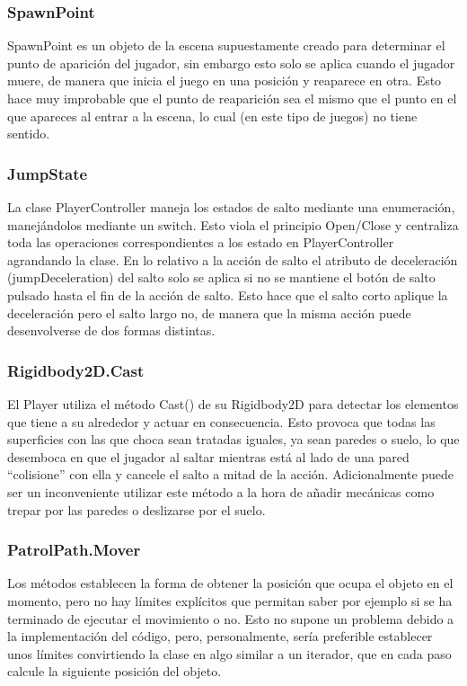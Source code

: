 \subsubsection{SpawnPoint}
SpawnPoint es un objeto de la escena supuestamente creado para determinar el punto de aparición del jugador, sin embargo esto solo se aplica cuando el jugador muere, de manera que inicia el juego en una posición y reaparece en otra. Esto hace muy improbable que el punto de reaparición sea el mismo que el punto en el que apareces al entrar a la escena, lo cual (en este tipo de juegos) no tiene sentido.

\subsubsection{JumpState}
La clase PlayerController maneja los estados de salto mediante una enumeración, manejándolos mediante un switch. Esto viola el principio Open/Close y centraliza toda las operaciones correspondientes a los estado en PlayerController agrandando la clase. 
En lo relativo a la acción de salto el atributo de deceleración (jumpDeceleration) del salto solo se aplica si no se mantiene el botón de salto pulsado hasta el fin de la acción de salto. Esto hace que el salto corto aplique la deceleración pero el salto largo no, de manera que la misma acción puede desenvolverse de dos formas distintas. 

\subsubsection{Rigidbody2D.Cast}
El Player utiliza el método Cast() de su Rigidbody2D para detectar los elementos que tiene a su alrededor y actuar en consecuencia. Esto provoca que todas las superficies con las que choca sean tratadas iguales, ya sean paredes o suelo, lo que desemboca en que el jugador al saltar mientras está al lado de una pared “colisione” con ella y cancele el salto a mitad de la acción. Adicionalmente puede ser un inconveniente utilizar este método a la hora de añadir mecánicas como trepar por las paredes o deslizarse por el suelo. 

\subsubsection{PatrolPath.Mover}
Los métodos establecen la forma de obtener la posición que ocupa el objeto en el momento, pero no hay límites explícitos que permitan saber por ejemplo si se ha terminado de ejecutar el movimiento o no. Esto no supone un problema debido a la implementación del código, pero, personalmente, sería preferible establecer unos límites convirtiendo la clase en algo similar a un iterador, que en cada paso calcule la siguiente posición del objeto.

